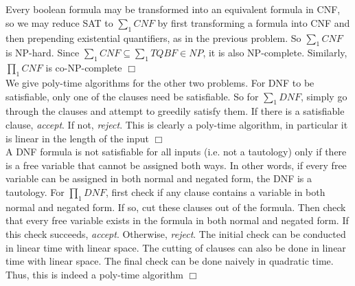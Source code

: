 \documentclass{article}
\begin{document}
\section{}
Every boolean formula may be transformed into an equivalent formula in CNF, so we may reduce SAT to $\sum_1 CNF$ by first transforming a formula into CNF and then prepending existential quantifiers, as in the previous problem. So $\sum_1 CNF$ is NP-hard. Since $\sum_1 CNF \subseteq \sum_1 TQBF \in NP$, it is also NP-complete. Similarly, $\prod_1 CNF$ is co-NP-complete $\Box$\\
We give poly-time algorithms for the other two problems. For DNF to be satisfiable, only one of the clauses need be satisfiable. So for $\sum_1 DNF$, simply go through the clauses and attempt to greedily satisfy them. If there is a satisfiable clause, \textit{accept}. If not, \textit{reject}. This is clearly a poly-time algorithm, in particular it is linear in the length of the input $\Box$\\
A DNF formula is not satisfiable for all inputs (i.e. not a tautology) only if there is a free variable that cannot be assigned both ways. In other words, if every free variable can be assigned in both normal and negated form, the DNF is a tautology. For $\prod_1 DNF$, first check if any clause contains a variable in both normal and negated form. If so, cut these clauses out of the formula. Then check that every free variable exists in the formula in both normal and negated form. If this check succeeds, \textit{accept}. Otherwise, \textit{reject}. The initial check can be conducted in linear time with linear space. The cutting of clauses can also be done in linear time with linear space. The final check can be done naively in quadratic time. Thus, this is indeed a poly-time algorithm $\Box$
\end{document}
